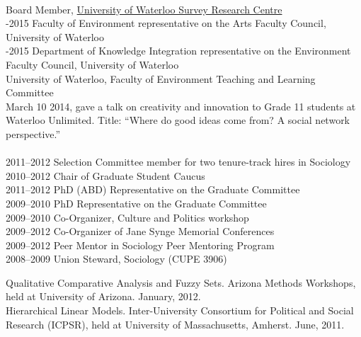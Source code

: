 \documentclass[9pt,usenames,dvipsnames]{article}
\begin{document}
 \\
 Board Member, \href{http://math.uwaterloo.ca/survey-research-centre/node/1}{University of Waterloo Survey Research Centre}  \\

-2015 Faculty of Environment representative on the Arts Faculty Council, University of Waterloo \\

-2015 Department of Knowledge Integration representative on the Environment Faculty Council, University of Waterloo \\

 University of Waterloo, Faculty of Environment Teaching and Learning Committee \\

\ind March 10 2014, gave a talk on creativity and innovation to Grade 11 students at Waterloo Unlimited. Title: ``Where do good ideas come from? A social network perspective.'' \\

\\
2011–2012 Selection Committee member for two tenure-track hires in Sociology\\
2010–2012 Chair of Graduate Student Caucus\\
2011–2012 PhD (ABD) Representative on the Graduate Committee\\
2009–2010 PhD Representative on the Graduate Committee\\
2009–2010 Co-Organizer, Culture and Politics workshop\\
2009–2012 Co-Organizer of Jane Synge Memorial Conferences\\
2009–2012 Peer Mentor in Sociology Peer Mentoring Program\\
2008–2009 Union Steward, Sociology (CUPE 3906)\\



\mediumskip%

\ind Qualitative Comparative Analysis and Fuzzy Sets. Arizona Methods Workshops, held at University of Arizona. January, 2012.\\

\ind Hierarchical Linear Models. Inter-University Consortium for Political and Social Research (ICPSR), held at University of Massachusetts, Amherst. June, 2011.\\
\end{document}
